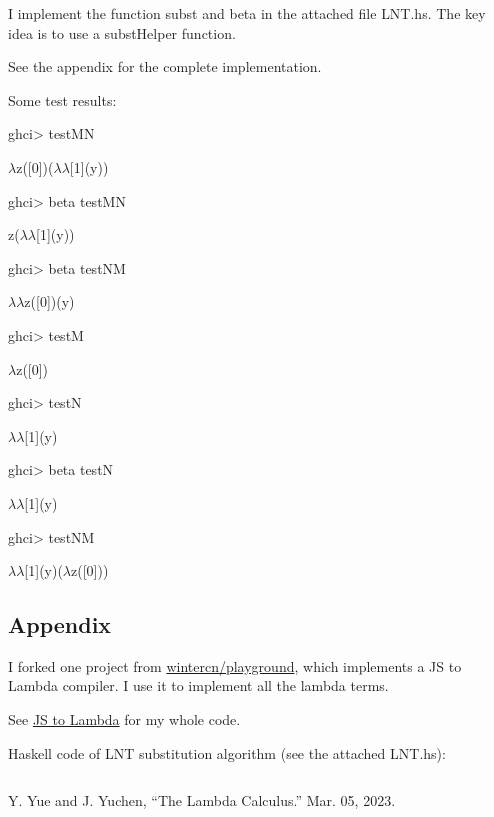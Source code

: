 \documentclass{article}
\theoremstyle{definition}
\newcommand{\lb}{$\lambda$}
\begin{document}
I implement the function \textsf{subst} and \textsf{beta} in the attached file \textsf{LNT.hs}.
The key idea is to use a \textsf{substHelper} function.

See the appendix for the complete implementation.

Some test results:

\begin{tcolorbox}
    \textsf{ghci>} testMN

    \lb z([0])(\lb \lb [1](y))

    \textsf{ghci>} beta testMN

    z(\lb \lb [1](y))

    \textsf{ghci>} beta testNM

    \lb \lb z([0])(y)

    \textsf{ghci>} testM

    \lb z([0])

    \textsf{ghci>} testN

    \lb \lb [1](y)

    \textsf{ghci>} beta testN

    \lb \lb [1](y)

    \textsf{ghci>} testNM

    \lb \lb [1](y)(\lb z([0]))
\end{tcolorbox}

\subsection*{Appendix}

I forked one project from \href{https://github.com/wintercn/playground}{wintercn/playground}, which implements a JS to Lambda compiler.
I use it to implement all the lambda terms.

See \href{https://linsyking.github.io/lambda-playground/lambda.html?source=gist:93613afa70a3065aa03a989e5e7b537d}{JS to Lambda} for my whole code.

Haskell code of LNT substitution algorithm (see the attached \textsf{LNT.hs}):

\inputminted{haskell}{LNT.hs}

\begin{thebibliography}{9}
     Y. Yue and J. Yuchen, “The Lambda Calculus.” Mar. 05, 2023.
\end{thebibliography}
\end{document}
